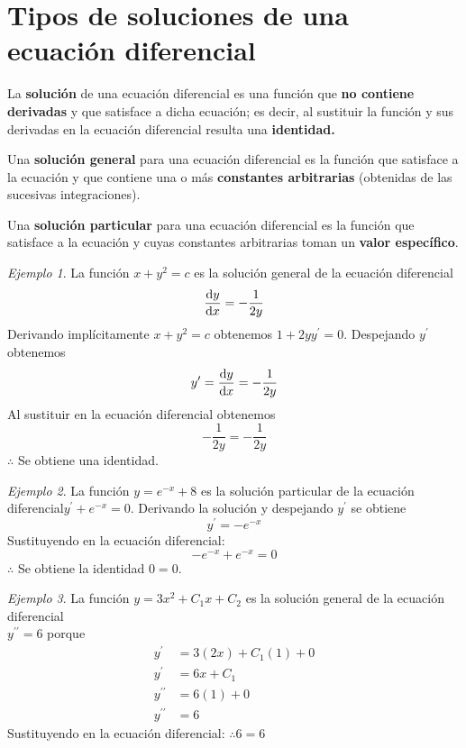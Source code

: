 \documentclass[12pt]{article} %
\theoremstyle{remark} %
\newtheorem{ejemplo}{Ejemplo}[section]
\newcommand{\ed}{ecuación diferencial}
\begin{document}
\section{Tipos de soluciones de una ecuación diferencial}
La \textbf{solución} de una ecuación diferencial es una función que \textbf{no contiene derivadas} y 
que satisface a dicha ecuación; es decir, al sustituir la función y sus derivadas en la ecuación diferencial 
resulta una \textbf{identidad.}

Una \textbf{solución general} para una ecuación diferencial es la función que satisface a la ecuación y que contiene una o más 
\textbf{constantes arbitrarias} (obtenidas de las sucesivas integraciones).

Una \textbf{solución particular} para una ecuación diferencial es la función que satisface a la ecuación y 
cuyas constantes arbitrarias toman un \textbf{valor específico}.

\begin{ejemplo}
  La función $x + y^2 =c$ es la solución general de la ecuación diferencial \[\dv{y}{x} = - \frac{1}{2y}\]
  Derivando implícitamente $x + y^2 = c$ obtenemos $1+2yy^{\prime} = 0$.
  Despejando $y^{\prime}$ obtenemos \[y^{\prime} = \dv{y}{x} = - \frac{1}{2y}\]
  Al sustituir en la ecuación diferencial obtenemos \[- \frac{1}{2y} = - \frac{1}{2y}\]
  $\therefore$ Se obtiene una identidad.
\end{ejemplo}

\begin{ejemplo}
  La función $y = e^{-x} + 8$ es la solución particular de la \ed $y^{\prime} + e^{-x} = 0$.
  Derivando la solución y despejando $y^{\prime}$ se obtiene \[y^{\prime} = -e^{-x}\]
  Sustituyendo en la \ed : \[-e^{-x} + e^{-x} = 0\]
  $\therefore$ Se obtiene la identidad $0=0$.
\end{ejemplo}

\begin{ejemplo}
  La función $y = 3x^2 + C_1x + C_2$ es la solución general de la \ed \\ $y^{\prime \prime} = 6$ porque 
  \begin{align*}
    y^{\prime} &= 3(2x) + C_1 (1) + 0 \\
    y^{\prime} &= 6x + C_1 \\
    y^{\prime \prime} &= 6(1) + 0 \\
    y^{\prime \prime} &= 6
  \end{align*}
  Sustituyendo en la ecuación diferencial: $\therefore 6 = 6$
\end{ejemplo}
\end{document}
